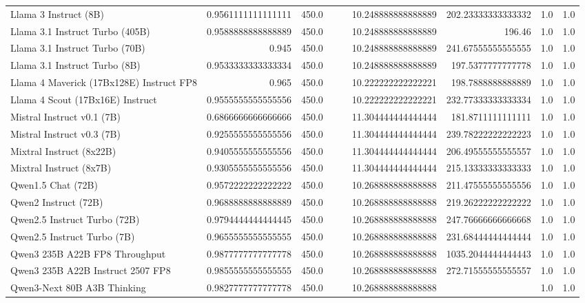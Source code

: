 \begin{table}[htp]
{\begin{tabular}{lrrrrrrrr}
Llama 3 Instruct (8B) & 0.9561111111111111 & 450.0 &  &  & 10.248888888888889 & 202.23333333333332 & 1.0 & 1.0 \\
Llama 3.1 Instruct Turbo (405B) & 0.9588888888888889 & 450.0 &  &  & 10.248888888888889 & 196.46 & 1.0 & 1.0 \\
Llama 3.1 Instruct Turbo (70B) & 0.945 & 450.0 &  &  & 10.248888888888889 & 241.67555555555555 & 1.0 & 1.0 \\
Llama 3.1 Instruct Turbo (8B) & 0.9533333333333334 & 450.0 &  &  & 10.248888888888889 & 197.5377777777778 & 1.0 & 1.0 \\
Llama 4 Maverick (17Bx128E) Instruct FP8 & 0.965 & 450.0 &  &  & 10.222222222222221 & 198.7888888888889 & 1.0 & 1.0 \\
Llama 4 Scout (17Bx16E) Instruct & 0.9555555555555556 & 450.0 &  &  & 10.222222222222221 & 232.77333333333334 & 1.0 & 1.0 \\
Mistral Instruct v0.1 (7B) & 0.6866666666666666 & 450.0 &  &  & 11.304444444444444 & 181.8711111111111 & 1.0 & 1.0 \\
Mistral Instruct v0.3 (7B) & 0.9255555555555556 & 450.0 &  &  & 11.304444444444444 & 239.78222222222223 & 1.0 & 1.0 \\
Mixtral Instruct (8x22B) & 0.9405555555555556 & 450.0 &  &  & 11.304444444444444 & 206.49555555555557 & 1.0 & 1.0 \\
Mixtral Instruct (8x7B) & 0.9305555555555556 & 450.0 &  &  & 11.304444444444444 & 215.13333333333333 & 1.0 & 1.0 \\
Qwen1.5 Chat (72B) & 0.9572222222222222 & 450.0 &  &  & 10.268888888888888 & 211.47555555555556 & 1.0 & 1.0 \\
Qwen2 Instruct (72B) & 0.9688888888888889 & 450.0 &  &  & 10.268888888888888 & 219.26222222222222 & 1.0 & 1.0 \\
Qwen2.5 Instruct Turbo (72B) & 0.9794444444444445 & 450.0 &  &  & 10.268888888888888 & 247.76666666666668 & 1.0 & 1.0 \\
Qwen2.5 Instruct Turbo (7B) & 0.9655555555555555 & 450.0 &  &  & 10.268888888888888 & 231.68444444444444 & 1.0 & 1.0 \\
Qwen3 235B A22B FP8 Throughput & 0.9877777777777778 & 450.0 &  &  & 10.268888888888888 & 1035.2044444444443 & 1.0 & 1.0 \\
Qwen3 235B A22B Instruct 2507 FP8 & 0.9855555555555555 & 450.0 &  &  & 10.268888888888888 & 272.71555555555557 & 1.0 & 1.0 \\
Qwen3-Next 80B A3B Thinking & 0.9827777777777778 & 450.0 &  &  & 10.268888888888888 &  & 1.0 & 1.0 \\

\end{tabular}}
\end{table}
